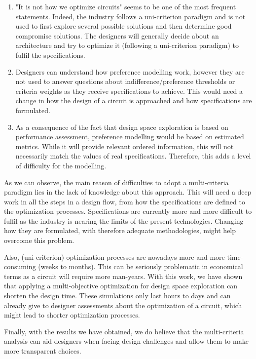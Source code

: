 \begin{enumerate}
\item "It is not how we optimize circuits" seems to be one of the most frequent statements. Indeed, the industry follows a uni-criterion paradigm and is not used to first explore several possible solutions and then determine good compromise solutions. The designers will generally decide about an architecture and try to optimize it (following a uni-criterion paradigm) to fulfil the specifications.
\item Designers can understand how preference modelling work, however they are not used to answer questions about indifference/preference thresholds or criteria weights as they receive specifications to achieve. This would need a change in how the design of a circuit is approached and how specifications are formulated.
\item As a consequence of the fact that design space exploration is based on performance assessment, preference modelling would be based on estimated metrics. While it will provide relevant ordered information, this will not necessarily match the values of real specifications. Therefore, this adds a level of difficulty for the modelling.
\end{enumerate}

As we can observe, the main reason of difficulties to adopt a multi-criteria paradigm lies in the lack of knowledge about this approach. This will need a deep work in all the steps in a design flow, from how the specifications are defined to the optimization processes. Specifications are currently more and more difficult to fulfil as the industry is nearing the limits of the present technologies. Changing how they are formulated, with therefore adequate methodologies, might help overcome this problem.

Also, (uni-criterion) optimization processes are nowadays more and more time-consuming (weeks to months). This can be seriously problematic in economical terms as a circuit will require more man-years. With this work, we have shown that applying a multi-objective optimization for design space exploration can shorten the design time. These simulations only last hours to days and can already give to designer assessments about the optimization of a circuit, which might lead to shorter optimization processes.

Finally, with the results we have obtained, we do believe that the multi-criteria analysis can aid designers when facing design challenges and allow them to make more transparent choices.


